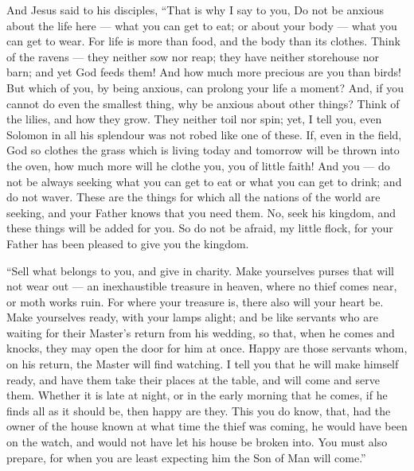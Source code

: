  And Jesus said to his disciples, ``That is why I say to
you, Do not be anxious about the life here --- what you can get to eat;
or about your body --- what you can get to wear.  For life
is more than food, and the body than its clothes.  Think of
the ravens --- they neither sow nor reap; they have neither storehouse
nor barn; and yet God feeds them! And how much more precious are you
than birds!  But which of you, by being anxious, can
prolong your life a moment?  And, if you cannot do even the
smallest thing, why be anxious about other things?  Think
of the lilies, and how they grow. They neither toil nor spin; yet, I
tell you, even Solomon in all his splendour was not robed like one of
these.  If, even in the field, God so clothes the grass
which is living today and tomorrow will be thrown into the oven, how
much more will he clothe you, you of little faith!  And you
--- do not be always seeking what you can get to eat or what you can get
to drink; and do not waver.  These are the things for which
all the nations of the world are seeking, and your Father knows that you
need them.  No, seek his kingdom, and these things will be
added for you.  So do not be afraid, my little flock, for
your Father has been pleased to give you the kingdom.

 ``Sell what belongs to you, and give in charity. Make
yourselves purses that will not wear out --- an inexhaustible treasure
in heaven, where no thief comes near, or moth works ruin. 
For where your treasure is, there also will your heart be. 
Make yourselves ready, with your lamps alight;  and be like
servants who are waiting for their Master's return from his wedding, so
that, when he comes and knocks, they may open the door for him at once.
 Happy are those servants whom, on his return, the Master
will find watching. I tell you that he will make himself ready, and have
them take their places at the table, and will come and serve them.
 Whether it is late at night, or in the early morning that
he comes, if he finds all as it should be, then happy are they.
 This you do know, that, had the owner of the house known
at what time the thief was coming, he would have been on the watch, and
would not have let his house be broken into.  You must also
prepare, for when you are least expecting him the Son of Man will
come.''

